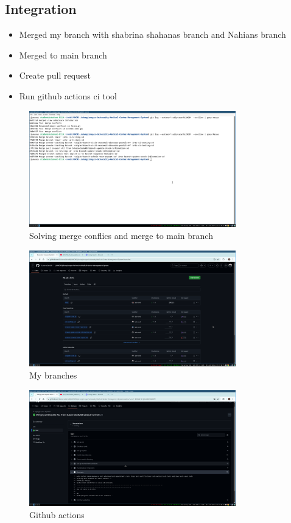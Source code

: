 \documentclass[a4paper,12pt]{article}
\begin{document}
\subsection{Integration}
\begin{itemize}
    \item Merged my branch with shabrina shahanas branch and Nahians branch
    \item Merged to main branch
    \item Create pull request
    \item Run github actions ci tool
\end{itemize}

\begin{figure}[H]
    \centering
    \includegraphics[width=0.8\textwidth]{images/merge.png}
    \caption{Solving merge conflics and merge to main branch}
    \label{fig:merge}
\end{figure}


\begin{figure}[H]
    \centering
    \includegraphics[width=0.8\textwidth]{images/mybranch.png}
    \caption{My branches}
    \label{fig:branches}
\end{figure}


\begin{figure}[H]
    \centering
    \includegraphics[width=0.8\textwidth]{images/githubaction.png}
    \caption{Github actions}
    \label{fig:cicd.yml}
\end{figure}
\end{document}
